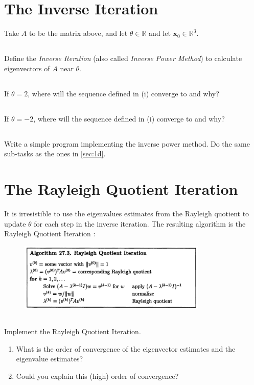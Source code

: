 \documentclass[11pt,letterpaper]{article}
\begin{document}
\section{The Inverse Iteration}
Take $A$ to be the matrix above, and let $\theta\in\mathbb{R}$ and let ${\boldsymbol x_0}\in\mathbb{R}^3$.
\subsection{}
Define the \emph{Inverse Iteration} (also called
  \emph{Inverse Power Method}) to calculate eigenvectors of $A$ near
  $\theta$.

\subsection{}
If $\theta=2$, where will the sequence defined in (i)
  converge to and why?

\subsection{}
If $\theta=-2$, where will the sequence defined in (i)
  converge to and why?

\subsection{}
Write a simple program implementing the inverse power method. Do the same sub-tasks as the ones in \ref{sec:1d}.

\section{The Rayleigh Quotient Iteration}
It is irresistible to use the eigenvalues estimates from the Rayleigh quotient to update $\theta$ for each step in the inverse iteration. The resulting algorithm is the Rayleigh Quotient Iteration \cite{TrefethenBau_97}:
\begin{figure}[H]
    \centering
    \includegraphics[width = 0.8\textwidth]{figs/TB_Rayleigh_Quo_Iter}
\end{figure}

\subsection{}
Implement the Rayleigh Quotient Iteration. 
\begin{enumerate}
    \item What is the order of convergence of the eigenvector estimates and the eigenvalue estimates?
    \item Could you explain this (high) order of convergence?
\end{enumerate}



\vfill


\end{document}
